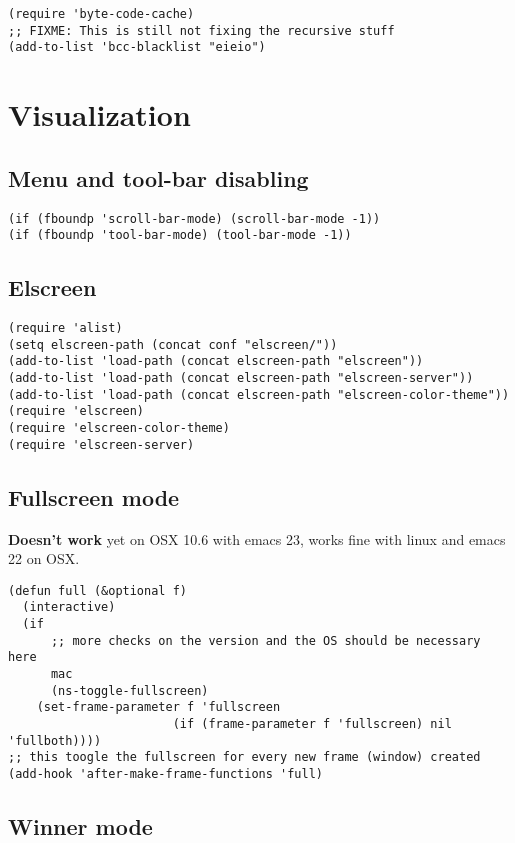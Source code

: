 \documentclass[11pt]{article}
\begin{document}
\begin{verbatim}
(require 'byte-code-cache)
;; FIXME: This is still not fixing the recursive stuff
(add-to-list 'bcc-blacklist "eieio")
\end{verbatim}
\section{Visualization}
\label{sec-22}
\subsection{Menu and tool-bar disabling}
\label{sec-22.1}

\begin{verbatim}
(if (fboundp 'scroll-bar-mode) (scroll-bar-mode -1))
(if (fboundp 'tool-bar-mode) (tool-bar-mode -1))
\end{verbatim}
\subsection{Elscreen}
\label{sec-22.2}

\begin{verbatim}
(require 'alist)
(setq elscreen-path (concat conf "elscreen/"))
(add-to-list 'load-path (concat elscreen-path "elscreen"))
(add-to-list 'load-path (concat elscreen-path "elscreen-server"))
(add-to-list 'load-path (concat elscreen-path "elscreen-color-theme"))
(require 'elscreen)
(require 'elscreen-color-theme)
(require 'elscreen-server)
\end{verbatim}
\subsection{Fullscreen mode}
\label{sec-22.3}

   \textbf{Doesn't work} yet on OSX 10.6 with emacs 23, works fine with linux and emacs 22 on OSX.
  
\begin{verbatim}
(defun full (&optional f)
  (interactive)
  (if
      ;; more checks on the version and the OS should be necessary here
      mac
      (ns-toggle-fullscreen)
    (set-frame-parameter f 'fullscreen
                       (if (frame-parameter f 'fullscreen) nil 'fullboth))))
;; this toogle the fullscreen for every new frame (window) created
(add-hook 'after-make-frame-functions 'full)
\end{verbatim}
\subsection{Winner mode}
\label{sec-22.4}
\end{document}
